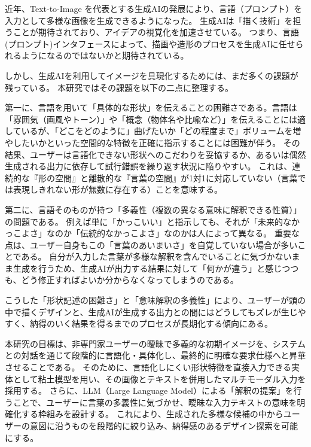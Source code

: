 \documentclass{kuisthesis}
\begin{document}
近年、Text-to-Image を代表とする生成AIの発展により、言語（プロンプト）を入力として多様な画像を生成できるようになった。
生成AIは「描く技術」を担うことが期待されており、アイデアの視覚化を加速させている。
つまり、言語(プロンプト)インタフェースによって、描画や造形のプロセスを生成AIに任せられるようになるのではないかと期待されている。

しかし、生成AIを利用してイメージを具現化するためには、まだ多くの課題が残っている。
本研究ではその課題を以下の二点に整理する。

第一に、言語を用いて「具体的な形状」を伝えることの困難さである。言語は「雰囲気（画風やトーン）」や「概念（物体名や比喩など）」を伝えることには適しているが、「どこをどのように」曲げたいか「どの程度まで」ボリュームを増やしたいかといった空間的な特徴を正確に指示することには困難が伴う。
その結果、ユーザーは言語化できない形状へのこだわりを妥協するか、あるいは偶然生成される出力に依存して試行錯誤を繰り返す状況に陥りやすい。
これは、連続的な『形の空間』と離散的な『言葉の空間』が1対1に対応していない（言葉では表現しきれない形が無数に存在する）ことを意味する。

第二に、言語そのものが持つ「多義性（複数の異なる意味に解釈できる性質）」の問題である。
例えば単に「かっこいい」と指示しても、それが「未来的なかっこよさ」なのか「伝統的なかっこよさ」なのかは人によって異なる。 
重要な点は、ユーザー自身もこの「言葉のあいまいさ」を自覚していない場合が多いことである。 
自分が入力した言葉が多様な解釈を含んでいることに気づかないまま生成を行うため、生成AIが出力する結果に対して「何かが違う」と感じつつも、どう修正すればよいか分からなくなってしまうのである。

こうした「形状記述の困難さ」と「意味解釈の多義性」により、ユーザーが頭の中で描くデザインと、生成AIが生成する出力との間にはどうしてもズレが生じやすく、納得のいく結果を得るまでのプロセスが長期化する傾向にある。

本研究の目標は、非専門家ユーザーの曖昧で多義的な初期イメージを、システムとの対話を通じて段階的に言語化・具体化し、最終的に明確な要求仕様へと昇華させることである。
そのために、言語化しにくい形状特徴を直接入力できる実体として粘土模型を用い、その画像とテキストを併用したマルチモーダル入力を採用する。
さらに、LLM（Large Language Model）による「解釈の提案」を行うことで、ユーザーに言葉の多義性に気づかせ、曖昧な入力テキストの意味を明確化する枠組みを設計する。
これにより、生成された多様な候補の中からユーザーの意図に沿うものを段階的に絞り込み、納得感のあるデザイン探索を可能にする。
\end{document}
